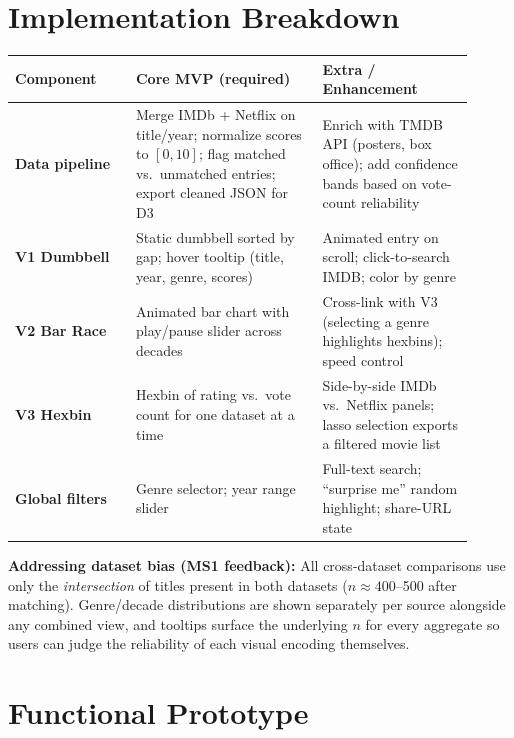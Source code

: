\documentclass[a4paper,10pt]{article}
\begin{document}
\section{Implementation Breakdown}

\begin{center}
\renewcommand{\arraystretch}{1.15}
\begin{tabular}{@{}p{0.24\linewidth}p{0.37\linewidth}p{0.30\linewidth}@{}}
\toprule
\textbf{Component} & \textbf{Core MVP (required)} & \textbf{Extra / Enhancement} \\
\midrule
\textbf{Data pipeline} &
  Merge IMDb + Netflix on title/year; normalize scores to $[0,10]$; flag
  matched vs.\ unmatched entries; export cleaned JSON for D3 &
  Enrich with TMDB API (posters, box office); add confidence bands based
  on vote-count reliability \\
\addlinespace
\textbf{V1 Dumbbell} &
  Static dumbbell sorted by gap; hover tooltip (title, year, genre, scores) &
  Animated entry on scroll; click-to-search IMDB; color by genre \\
\addlinespace
\textbf{V2 Bar Race} &
  Animated bar chart with play/pause slider across decades &
  Cross-link with V3 (selecting a genre highlights hexbins); speed control \\
\addlinespace
\textbf{V3 Hexbin} &
  Hexbin of rating vs.\ vote count for one dataset at a time &
  Side-by-side IMDb vs.\ Netflix panels; lasso selection exports a filtered
  movie list \\
\addlinespace
\textbf{Global filters} &
  Genre selector; year range slider &
  Full-text search; ``surprise me'' random highlight; share-URL state \\
\bottomrule
\end{tabular}
\end{center}

\vspace{0.2cm}

\noindent\textbf{Addressing dataset bias (MS1 feedback):} All cross-dataset
comparisons use only the \emph{intersection} of titles present in both datasets
($n \approx 400$--500 after matching). Genre/decade distributions are shown
separately per source alongside any combined view, and tooltips surface the
underlying $n$ for every aggregate so users can judge the reliability of each
visual encoding themselves.

\section{Functional Prototype}
\end{document}
